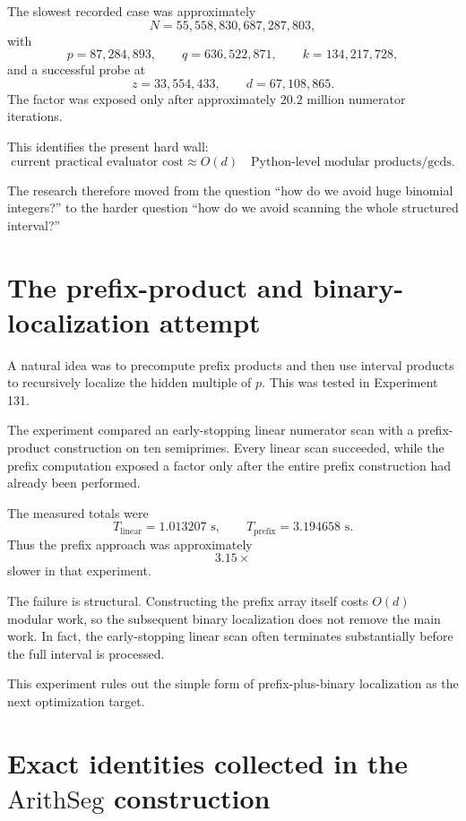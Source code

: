 \documentclass[11pt,a4paper]{article}
\newcommand{\Arith}{\mathrm{ArithSeg}}
\begin{document}
The slowest recorded case was approximately
\[
N=55{,}558{,}830{,}687{,}287{,}803,
\]
with
\[
p=87{,}284{,}893,
\qquad
q=636{,}522{,}871,
\qquad
k=134{,}217{,}728,
\]
and a successful probe at
\[
z=33{,}554{,}433,
\qquad d=67{,}108{,}865.
\]
The factor was exposed only after approximately $20.2$ million numerator iterations.

This identifies the present hard wall:
\begin{equation}
\boxed{
\text{current practical evaluator cost}\approx O(d)
\quad\text{Python-level modular products/gcds}.
}
\end{equation}

The research therefore moved from the question ``how do we avoid huge binomial integers?'' to the harder question ``how do we avoid scanning the whole structured interval?''

\section{The prefix-product and binary-localization attempt}
\label{sec:prefix}

A natural idea was to precompute prefix products and then use interval products to recursively localize the hidden multiple of $p$. This was tested in Experiment 131.

The experiment compared an early-stopping linear numerator scan with a prefix-product construction on ten semiprimes. Every linear scan succeeded, while the prefix computation exposed a factor only after the entire prefix construction had already been performed.

The measured totals were
\[
T_{\mathrm{linear}}=1.013207\text{ s},
\qquad
T_{\mathrm{prefix}}=3.194658\text{ s}.
\]
Thus the prefix approach was approximately
\[
3.15\times
\]
slower in that experiment.

The failure is structural. Constructing the prefix array itself costs $O(d)$ modular work, so the subsequent binary localization does not remove the main work. In fact, the early-stopping linear scan often terminates substantially before the full interval is processed.

This experiment rules out the simple form of prefix-plus-binary localization as the next optimization target.

\section{Exact identities collected in the \texorpdfstring{$\Arith$}{ArithSeg} construction}
\label{sec:identities}
\end{document}
